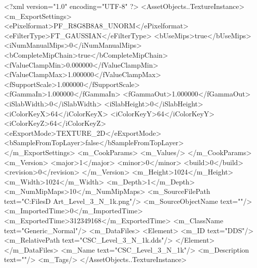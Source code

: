 <?xml version="1.0" encoding="UTF-8" ?>
<AssetObjects..TextureInstance>
	<m_ExportSettings>
		<ePixelformat>PF_R8G8B8A8_UNORM</ePixelformat>
		<eFilterType>FT_GAUSSIAN</eFilterType>
		<bUseMips>true</bUseMips>
		<iNumManualMips>0</iNumManualMips>
		<bCompleteMipChain>true</bCompleteMipChain>
		<fValueClampMin>0.000000</fValueClampMin>
		<fValueClampMax>1.000000</fValueClampMax>
		<fSupportScale>1.000000</fSupportScale>
		<fGammaIn>1.000000</fGammaIn>
		<fGammaOut>1.000000</fGammaOut>
		<iSlabWidth>0</iSlabWidth>
		<iSlabHeight>0</iSlabHeight>
		<iColorKeyX>64</iColorKeyX>
		<iColorKeyY>64</iColorKeyY>
		<iColorKeyZ>64</iColorKeyZ>
		<eExportMode>TEXTURE_2D</eExportMode>
		<bSampleFromTopLayer>false</bSampleFromTopLayer>
	</m_ExportSettings>
	<m_CookParams>
		<m_Values/>
	</m_CookParams>
	<m_Version>
		<major>1</major>
		<minor>0</minor>
		<build>0</build>
		<revision>0</revision>
	</m_Version>
	<m_Height>1024</m_Height>
	<m_Width>1024</m_Width>
	<m_Depth>1</m_Depth>
	<m_NumMipMaps>10</m_NumMipMaps>
	<m_SourceFilePath text="C:\Users\Shadow\Desktop\Working Files\3D Art\CSC_Level_3_N_1k.png"/>
	<m_SourceObjectName text=""/>
	<m_ImportedTime>0</m_ImportedTime>
	<m_ExportedTime>312349168</m_ExportedTime>
	<m_ClassName text="Generic_Normal"/>
	<m_DataFiles>
		<Element>
			<m_ID text="DDS"/>
			<m_RelativePath text="CSC_Level_3_N_1k.dds"/>
		</Element>
	</m_DataFiles>
	<m_Name text="CSC_Level_3_N_1k"/>
	<m_Description text=""/>
	<m_Tags/>
</AssetObjects..TextureInstance>

